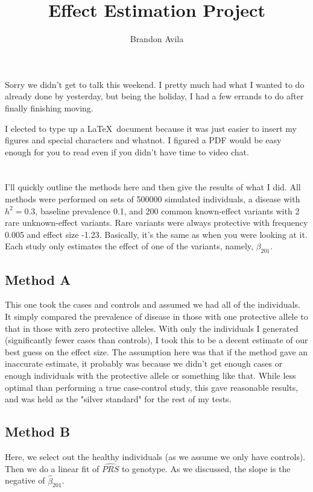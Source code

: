 \documentclass[11pt]{article} %
\title{Effect Estimation Project}
\author{Brandon Avila}
\begin{document}
\maketitle

\section{}
Sorry we didn't get to talk this weekend. I pretty much had what I wanted to do already done by yesterday, but being the holiday, I had a few errands to do after finally finishing moving.

I elected to type up a \LaTeX\ document because it was just easier to insert my figures and special characters and whatnot. I figured a PDF would be easy enough for you to read even if you didn't have time to video chat.

\section{}
I'll quickly outline the methods here and then give the results of what I did. All methods were performed on sets of 500000 simulated individuals, a disease with $h^2 = 0.3$, baseline prevalence 0.1, and 200 common known-effect variants with 2 rare unknown-effect variants. Rare variants were always protective with frequency 0.005 and effect size -1.23. Basically, it's the same as when you were looking at it. Each study only estimates the effect of one of the variants, namely, $\beta_{201}$.

\subsection{Method A}
This one took the cases and controls and assumed we had all of the individuals. It simply compared the prevalence of disease in those with one protective allele to that in those with zero protective alleles. With only the individuals I generated (significantly fewer cases than controls), I took this to be a decent estimate of our best guess on the effect size. The assumption here was that if the method gave an inaccurate estimate, it probably was because we didn't get enough cases or enough individuals with the protective allele or something like that. While less optimal than performing a true case-control study, this gave reasonable results, and was held as the "silver standard" for the rest of my tests.

\subsection{Method B}
Here, we select out the healthy individuals (as we assume we only have controls). Then we do a linear fit of $\widehat{PRS}$ to genotype. As we discussed, the slope is the negative of $\hat{\beta}_{201}$.
\end{document}
